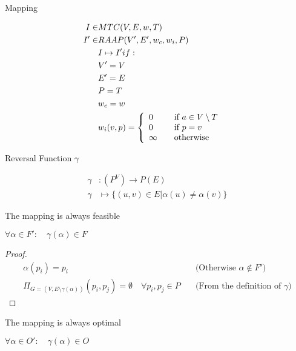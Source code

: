 \documentclass{article}
\begin{document}
\begin{definition}
Mapping

\begin{align}
	\nonumber I \in & MTC(V,E,w,T) &\\
	\nonumber I' \in & RAAP(V', E', w_c, w_i, P) &\\
	\nonumber & I \mapsto I' if: &\\
	\nonumber & V' = V\\
	\nonumber & E' = E\\
	\nonumber & P = T\\
	\nonumber & w_c = w\\
	\nonumber & w_i(v,p) = \mbox{$\left\{ 
		\begin{array}{l l}
			0 & \quad \mbox{if $a \in V \setminus T$}\\
			0 & \quad \mbox{if $p = v$}\\
			\infty & \quad \mbox{otherwise}\\ \end{array} \right.$}
\end{align}
\end{definition}

\begin{definition}
Reversal Function $\gamma$

\begin{align}
	\nonumber \gamma & : (P^V) \rightarrow P(E) \\
	\nonumber \gamma & \mapsto \{(u,v) \in E | \alpha(u) \neq \alpha(v)\}
\end{align}
\end{definition}

\begin{lemma}
The mapping is always feasible

$\forall \alpha \in F' : \quad \gamma(\alpha) \in F$
\end{lemma}

\begin{proof}
\begin{align}
	\nonumber \alpha(p_i) = p_i & \quad \mbox{(Otherwise $\alpha \not\in F'$)} \\
	\nonumber \Pi_{G=(V, E \setminus \gamma(\alpha))} (p_i, p_j) = \emptyset  \quad \forall p_i, p_j \in P & \quad \mbox{(From the definition of $\gamma$)}
\end{align}
\end{proof}

\begin{lemma}
The mapping is always optimal

$\forall \alpha \in O' : \quad \gamma(\alpha) \in O$
\end{lemma}
\end{document}
